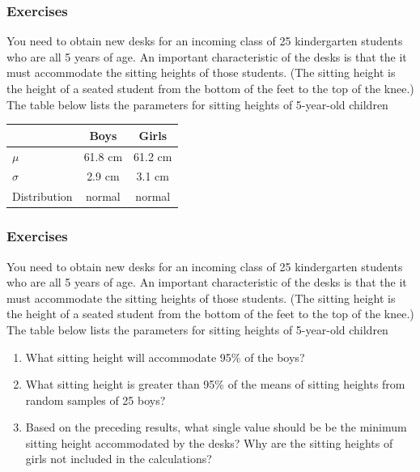 \documentclass[xcolor=dvipsnames]{beamer}
\begin{document}
\begin{frame}
  \frametitle{Exercises} 
  {\ubung} You need to obtain new desks for an incoming class of 25
  kindergarten students who are all 5 years of age. An important
  characteristic of the desks is that the it must accommodate the
  sitting heights of those students. (The sitting height is the height
  of a seated student from the bottom of the feet to the top of the
  knee.) The table below lists the parameters for sitting heights of
  5-year-old children

\medskip

  \begin{tabular}{|l|c|c|}\hline
                 & Boys    & Girls   \\ \hline
    $\mu$        & 61.8 cm & 61.2 cm \\ \hline
    $\sigma$     & 2.9 cm  & 3.1 cm  \\ \hline 
    Distribution & normal  & normal  \\ \hline
  \end{tabular}
\end{frame}

\begin{frame}
  \frametitle{Exercises} 
  {\ubung} You need to obtain new desks for an incoming class of 25
  kindergarten students who are all 5 years of age. An important
  characteristic of the desks is that the it must accommodate the
  sitting heights of those students. (The sitting height is the height
  of a seated student from the bottom of the feet to the top of the
  knee.) The table below lists the parameters for sitting heights of
  5-year-old children
  \begin{enumerate}
  \item What sitting height will accommodate 95\% of the boys?
  \item What sitting height is greater than 95\% of the means of
    sitting heights from random samples of 25 boys?
  \item Based on the preceding results, what single value should
    be be the minimum sitting height accommodated by the desks? Why
    are the sitting heights of girls not included in the calculations?
  \end{enumerate}
\end{frame}
\end{document}
